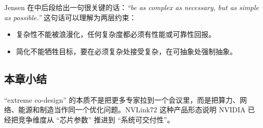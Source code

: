 Jensen 在中后段给出一句很关键的话：\textit{``be as complex as necessary, but as simple as possible.''} 这句话可以理解为两层约束：
\begin{itemize}
    \item 复杂性不能被浪漫化，任何复杂度都必须有性能或可靠性回报。
    \item 简化不能牺牲目标，要在必须复杂处接受复杂，在可抽象处强制抽象。
\end{itemize}

\subsection{本章小结}

``extreme co-design'' 的本质不是把更多专家拉到一个会议里，而是把算力、网络、能源和制造当作同一个优化问题。NVLink72 这种产品形态说明 NVIDIA 已经把竞争维度从 ``芯片参数'' 推进到 ``系统可交付性''。

